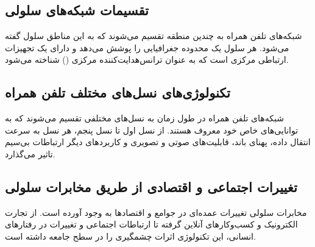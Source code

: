 \subsection{تقسیمات شبکه‌های سلولی}
شبکه‌های تلفن همراه به چندین منطقه تقسیم می‌شوند که به این مناطق سلول‌ گفته می‌شود. هر سلول یک محدوده جغرافیایی را پوشش می‌دهد و دارای یک تجهیزات ارتباطی مرکزی است که به عنوان ترانس‌هدایت‌کننده مرکزی () شناخته می‌شود.

\subsection{تکنولوژی‌های نسل‌های مختلف تلفن همراه}
شبکه‌های تلفن همراه در طول زمان به نسل‌های مختلفی تقسیم می‌شوند که به توانایی‌های خاص خود معروف هستند. از نسل اول تا نسل پنجم، هر نسل به سرعت انتقال داده، پهنای باند، قابلیت‌های صوتی و تصویری و کاربردهای دیگر ارتباطات بی‌سیم تاثیر می‌گذارد.

\subsection{تغییرات اجتماعی و اقتصادی از طریق مخابرات سلولی}
مخابرات سلولی تغییرات عمده‌ای در جوامع و اقتصادها به وجود آورده است. از تجارت الکترونیک و کسب‌وکارهای آنلاین گرفته تا ارتباطات اجتماعی و تغییرات در رفتارهای انسانی، این تکنولوژی اثرات چشمگیری را در سطح جامعه داشته است.

